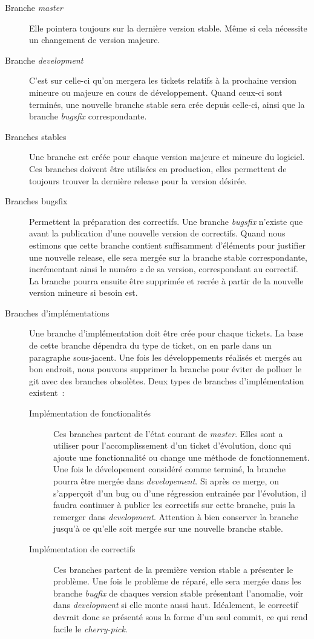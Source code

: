 \begin{description}
	\item[Branche \emph{master}]
		Elle pointera toujours sur la dernière version stable.
		Même si cela nécessite un changement de version majeure.
	\item[Branche \emph{development}]
		C'est sur celle-ci qu'on mergera les tickets relatifs à la prochaine version mineure ou majeure en cours de développement.
		Quand ceux-ci sont terminés, une nouvelle branche stable sera crée depuis celle-ci, ainsi que la branche \emph{bugsfix} correspondante.
	\item[Branches stables]
		Une branche est créée pour chaque version majeure et mineure du logiciel. Ces branches doivent être utilisées en production, elles permettent de toujours trouver la dernière release pour la version désirée.
	\item[Branches bugsfix]
		Permettent la préparation des correctifs.
		Une branche \emph{bugsfix} n'existe que avant la publication d'une nouvelle version de correctifs.
		Quand nous estimons que cette branche contient suffisamment d'éléments pour justifier une nouvelle release, elle sera mergée sur la branche stable correspondante, incrémentant ainsi le numéro \emph{z} de sa version, correspondant au correctif.
		La branche pourra ensuite être supprimée et recrée à partir de la nouvelle version mineure si besoin est.
	\item[Branches d'implémentations]
		Une branche d'implémentation doit être crée pour chaque tickets.
		La base de cette branche dépendra du type de ticket, on en parle dans un paragraphe sous-jacent.
		Une fois les développements réalisés et mergés au bon endroit, nous pouvons supprimer la branche pour éviter de polluer le git avec des branches obsolètes.
		Deux types de branches d'implémentation existent~:
		\begin{description}
			\item[Implémentation de fonctionalités]
				Ces branches partent de l'état courant de \emph{master}.
				Elles sont a utiliser pour l'accomplissement d'un ticket d'évolution, donc qui ajoute une fonctionnalité ou change une méthode de fonctionnement.
				Une fois le dévelopement considéré comme terminé, la branche pourra être mergée dans \emph{developement}.
				Si après ce merge, on s'apperçoit d'un bug ou d'une régression entrainée par l'évolution, il faudra continuer à publier les correctifs sur cette branche, puis la remerger dans \emph{development}.
				Attention à bien conserver la branche jusqu'à ce qu'elle soit mergée sur une nouvelle branche stable.
			\item[Implémentation de correctifs]
				Ces branches partent de la première version stable a présenter le problème.
				Une fois le problème de réparé, elle sera mergée dans les branche \emph{bugfix} de chaques version stable présentant l'anomalie, voir dans \emph{development} si elle monte aussi haut.
				Idéalement, le correctif devrait donc se présenté sous la forme d'un seul commit, ce qui rend facile le \emph{cherry-pick}.
		\end{description}
\end{description}

